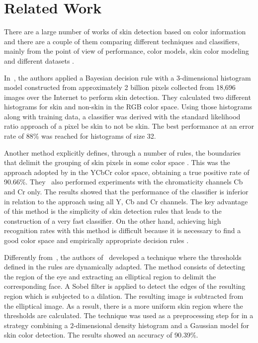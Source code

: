 \chapter{Related Work}
\label{cap:related-work}

There are a large number of works of skin detection based on color information and there are a couple of them comparing different techniques and classifiers, mainly from the point of view of performance, color models, skin color modeling and different datasets \citep{vezhnevets:03,kakumanu:07,mahmoodi:16}.

In~\citet{jones:02}, the authors applied a Bayesian decision rule with a $3$-dimensional histogram model constructed from approximately 2 billion pixels collected from 18,696 images over the Internet to perform skin detection. They calculated two different histograms for skin and non-skin in the RGB color space. Using those histograms along with training data, a classifier was derived with the standard likelihood ratio approach of a pixel be skin to not be skin. The best performance at an error rate of 88\% was reached for histograms of size 32.

Another method explicitly defines, through a number of rules, the boundaries that delimit the grouping of skin pixels in some color space \citep{vezhnevets:03}. This was the approach adopted by \citet{kovac:03} in the YCbCr color space, obtaining a true positive rate of 90.66\%. They~\citep{kovac:03} also performed experiments with the chromaticity channels Cb and Cr only. The results showed that the performance of the classifier is inferior in relation to the approach using all Y, Cb and Cr channels. The key advantage of this method is the simplicity of skin detection rules that leads to the construction of a very fast classifier. On the other hand, achieving high recognition rates with this method is difficult because it is necessary to find a good color space and empirically appropriate decision rules \citep{vezhnevets:03}.

Differently from~\citet{kovac:03}, the authors of~\citet{yogarajah:11} developed a technique where the thresholds defined in the rules are dynamically adapted. The method consists of detecting the region of the eye and extracting an elliptical region to delimit the corresponding face. A Sobel filter is applied to detect the edges of the resulting region which is subjected to a dilation. The resulting image is subtracted from the elliptical image. As a result, there is a more uniform skin region where the thresholds are calculated. The technique was used as a preprocessing step for \citet{tan:12} in a strategy combining a $2$-dimensional density histogram and a Gaussian model for skin color detection. The results showed an accuracy of 90.39\%.

